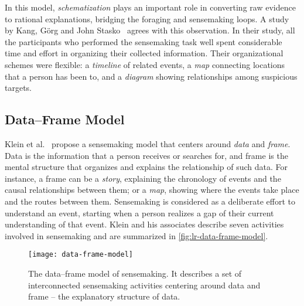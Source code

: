 In this model, \emph{schematization} plays an important role in converting raw evidence to rational explanations, bridging the foraging and sensemaking loops. A study by Kang, Görg and John Stasko~\cite{Kang2011} agrees with this observation. In their study, all the participants who performed the sensemaking task well spent considerable time and effort in organizing their collected information. Their organizational schemes were flexible: a \emph{timeline} of related events, a \emph{map} connecting locations that a person has been to, and a \emph{diagram} showing relationships among suspicious targets.

\subsection{Data--Frame Model}
\label{sub:lr-dfm}
Klein et al.~\cite{Klein2003} propose a sensemaking model that centers around \emph{data} and \emph{frame}. Data is the information that a person receives or searches for, and frame is the mental structure that organizes and explains the relationship of such data. For instance, a frame can be a \emph{story}, explaining the chronology of events and the causal relationships between them; or a \emph{map}, showing where the events take place and the routes between them. Sensemaking is considered as a deliberate effort to understand an event, starting when a person realizes a gap of their current understanding of that event. Klein and his associates describe seven activities involved in sensemaking and are summarized in \autoref{fig:lr-data-frame-model}.

\begin{figure}[!htb]
	\centering
	\texttt{[image: data-frame-model]}
	\caption{The data--frame model of sensemaking. It describes a set of interconnected sensemaking activities centering around data and frame -- the explanatory structure of data. }
	\label{fig:lr-data-frame-model}
\end{figure}

